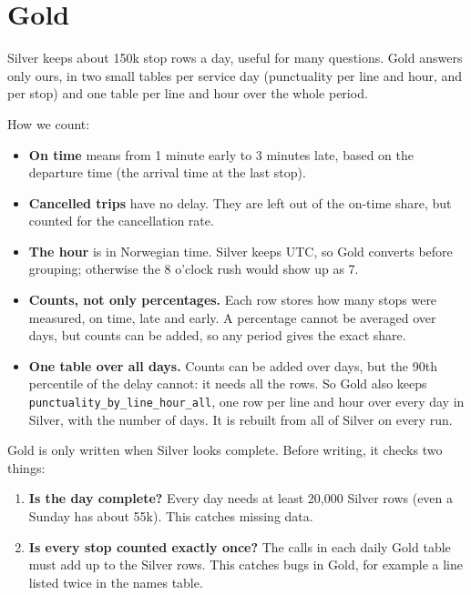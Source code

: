\documentclass[11pt,a4paper]{article}
\newcommand{\code}[1]{\texttt{#1}}
\begin{document}
\section{Gold}
\label{sec:gold}

Silver keeps about 150k stop rows a day, useful for many questions. Gold answers only ours, in
two small tables per service day (punctuality per line and hour, and per stop) and one table
per line and hour over the whole period.

How we count:
\begin{itemize}
  \item \textbf{On time} means from 1 minute early to 3 minutes late, based on the departure
        time (the arrival time at the last stop).
  \item \textbf{Cancelled trips} have no delay. They are left out of the on-time share, but
        counted for the cancellation rate.
  \item \textbf{The hour} is in Norwegian time. Silver keeps UTC, so Gold converts before
        grouping; otherwise the 8 o'clock rush would show up as 7.
  \item \textbf{Counts, not only percentages.} Each row stores how many stops were measured, on
        time, late and early. A percentage cannot be averaged over days, but counts can be
        added, so any period gives the exact share.
  \item \textbf{One table over all days.} Counts can be added over days, but the 90th
        percentile of the delay cannot: it needs all the rows. So Gold also keeps
        \code{punctuality\_by\_line\_hour\_all}, one row per line and hour over every day in
        Silver, with the number of days. It is rebuilt from all of Silver on every run.
\end{itemize}

Gold is only written when Silver looks complete. Before writing, it checks two things:
\begin{enumerate}[topsep=0.2em, itemsep=0.25em]
  \item \textbf{Is the day complete?} Every day needs at least 20{,}000 Silver rows (even a
        Sunday has about 55k). This catches missing data.
  \item \textbf{Is every stop counted exactly once?} The calls in each daily Gold table must add up
        to the Silver rows. This catches bugs in Gold, for example a line listed twice in the
        names table.
\end{enumerate}
\end{document}

